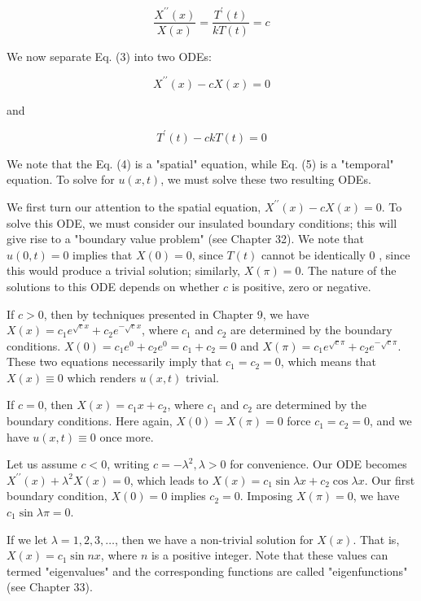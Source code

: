 \documentclass[10pt]{article}
\begin{document}
\begin{equation*}
\frac{X^{\prime \prime}(x)}{X(x)}=\frac{T^{\prime}(t)}{k T(t)}=c \tag{3}
\end{equation*}


We now separate Eq. (3) into two ODEs:


\begin{equation*}
X^{\prime \prime}(x)-c X(x)=0 \tag{4}
\end{equation*}


and


\begin{equation*}
T^{\prime}(t)-c k T(t)=0 \tag{5}
\end{equation*}


We note that the Eq. (4) is a "spatial" equation, while Eq. (5) is a "temporal" equation. To solve for $u(x, t)$, we must solve these two resulting ODEs.

We first turn our attention to the spatial equation, $X^{\prime \prime}(x)-c X(x)=0$. To solve this ODE, we must consider our insulated boundary conditions; this will give rise to a "boundary value problem" (see Chapter 32). We note that $u(0, t)=0$ implies that $X(0)=0$, since $T(t)$ cannot be identically 0 , since this would produce a trivial solution; similarly, $X(\pi)=0$. The nature of the solutions to this ODE depends on whether $c$ is positive, zero or negative.

If $c>0$, then by techniques presented in Chapter 9, we have $X(x)=c_{1} e^{\sqrt{c} x}+c_{2} e^{-\sqrt{c} x}$, where $c_{1}$ and $c_{2}$ are determined by the boundary conditions. $X(0)=c_{1} e^{0}+c_{2} e^{0}=c_{1}+c_{2}=0$ and $X(\pi)=c_{1} e^{\sqrt{c} \pi}+c_{2} e^{-\sqrt{c} \pi}$. These two equations necessarily imply that $c_{1}=c_{2}=0$, which means that $X(x) \equiv 0$ which renders $u(x, t)$ trivial.

If $c=0$, then $X(x)=c_{1} x+c_{2}$, where $c_{1}$ and $c_{2}$ are determined by the boundary conditions. Here again, $X(0)=X(\pi)=0$ force $c_{1}=c_{2}=0$, and we have $u(x, t) \equiv 0$ once more.

Let us assume $c<0$, writing $c=-\lambda^{2}, \lambda>0$ for convenience. Our ODE becomes $X^{\prime \prime}(x)+\lambda^{2} X(x)=0$, which leads to $X(x)=c_{1} \sin \lambda x+c_{2} \cos \lambda x$. Our first boundary condition, $X(0)=0$ implies $c_{2}=0$. Imposing $X(\pi)=0$, we have $c_{1} \sin \lambda \pi=0$.

If we let $\lambda=1,2,3, \ldots$, then we have a non-trivial solution for $X(x)$. That is, $X(x)=c_{1} \sin n x$, where $n$ is a positive integer. Note that these values can termed "eigenvalues" and the corresponding functions are called "eigenfunctions" (see Chapter 33).
\end{document}
